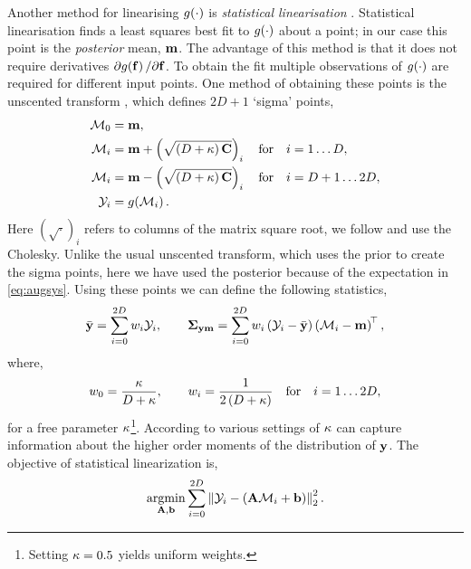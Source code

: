 \documentclass{article} %
\begin{document}
Another method for linearising $\nonlin{\cdot}$ is \emph{statistical
    linearisation} \cite{Geist2010}. Statistical linearisation finds a least
squares best fit to $\nonlin{\cdot}$ about a point; in our case this point is
the \emph{posterior} mean, $\pomean$. The advantage of this method is that it
does not require derivatives $\partial\nonlin{\lstate}/\partial\lstate$. To
obtain the fit multiple observations of $\nonlin{\cdot}$ are required for
different input points. One method of obtaining these points is the unscented
transform \cite{Julier2004}, which defines $2D+1$ `sigma' points,
\begin{align}
    \Sfunc_0 &= \pomean,
        \label{eq:spoint0} \\
    \Sfunc_i &= \pomean + \brac{\sqrt{\brac{D + \scoef} \pocov}}_i \quad
        \text{for} \quad i = 1 \ldots D, \\
    \Sfunc_i &= \pomean - \brac{\sqrt{\brac{D + \scoef} \pocov}}_i \quad
        \text{for} \quad i = D+1 \ldots 2D,
        \label{eq:spointi} \\
    \Sobs_i &= \nonlin{\Sfunc_i}.
\end{align}
Here $(\sqrt{\cdot})_i$ refers to columns of the matrix square root, we follow
\cite{Julier2004} and use the Cholesky. Unlike the usual unscented transform,
which uses the prior to create the sigma points, here we have used the
posterior because of the expectation in \eqref{eq:augsys}. Using these points
we can define the following statistics,
\begin{equation}
    \bar\obs = \sum^{2D}_{i=0} \Sw_i \Sobs_i,
    \qquad
    \xcov = \sum^{2D}_{i=0} \Sw_i \brac{\Sobs_i - \bar\obs}
        \brac{\Sfunc_i - \pomean}\transpose,
    \label{eq:slstats}
\end{equation}
where,
\begin{equation}
    \Sw_0 = \frac{\scoef}{D + \scoef},
        \qquad \Sw_i = \frac{1}{2\brac{D + \scoef}}
        \quad \text{for} \quad i = 1 \ldots 2D,
    \label{eq:slweights}
\end{equation}
for a free parameter $\scoef$\footnote{Setting $\scoef = 0.5$ yields
    uniform weights.}. According to \cite{Julier2004} various settings of
$\scoef$ can capture information about the higher order moments of the
distribution of $\obs$. The objective of statistical linearization is,
\begin{equation}
    \argmin_{\Linmat, \intcpt} \sum^{2D}_{i=0} 
        \lnorm{2}{\Sobs_i - \brac{\Linmat\Sfunc_i + \intcpt}}^2.
\end{equation}
\end{document}
